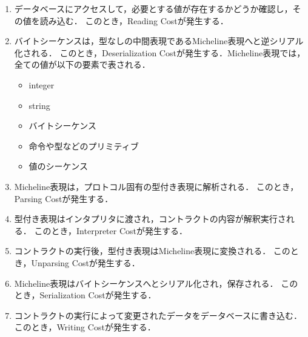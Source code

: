 \documentclass{kuisthesis}
\begin{document}
\begin{enumerate}
  \item データベースにアクセスして，必要とする値が存在するかどうか確認し，その値を読み込む．
  このとき，Reading Costが発生する．
  \item バイトシーケンスは，型なしの中間表現であるMicheline表現へと逆シリアル化される．
  このとき，Deserialization Costが発生する．Micheline表現では，全ての値が以下の要素で表される．
  \begin{itemize}
    \item integer
    \item string
    \item バイトシーケンス
    \item 命令や型などのプリミティブ
    \item 値のシーケンス
  \end{itemize}
  \item Micheline表現は，プロトコル固有の型付き表現に解析される．
  このとき，Parsing Costが発生する．
  \item 型付き表現はインタプリタに渡され，コントラクトの内容が解釈実行される．
  このとき，Interpreter Costが発生する．
  \item コントラクトの実行後，型付き表現はMicheline表現に変換される．
  このとき，Unparsing Costが発生する．
  \item Micheline表現はバイトシーケンスへとシリアル化され，保存される．
  このとき，Serialization Costが発生する．
  \item コントラクトの実行によって変更されたデータをデータベースに書き込む．
  このとき，Writing Costが発生する．
\end{enumerate}
\end{document}
